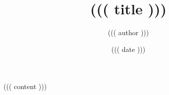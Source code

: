 \documentclass{((( documentclass )))}
\title{((( title )))}
\author{((( author )))}
\date{((( date )))}
\begin{document}
    ((( content )))
\end{document}

